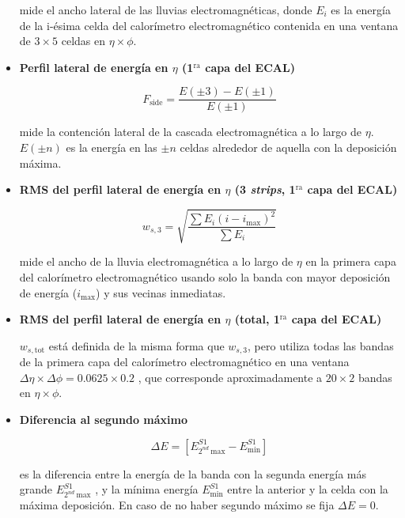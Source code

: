 \begin{itemize}
		mide el ancho lateral de las lluvias electromagnéticas, donde $E_{i}$ es la energía de la i-ésima celda del calorímetro electromagnético contenida en una ventana de $3\times 5$ celdas en $\eta \times \phi$.

	\item  \textbf{Perfil lateral de energía en $\eta$ (1$^{\text{ra}}$ capa del ECAL)}

		\begin{equation}
		F_{\text{side}}=\frac{E(\pm 3)-E(\pm 1)}{E(\pm 1)}
		\end{equation}

		mide la contención lateral de la cascada electromagnética a lo largo de $\eta$. $E(\pm n)$ es la energía en las $\pm n$ celdas alrededor de aquella con la deposición máxima.

	\item  \textbf{RMS del perfil lateral de energía en $\eta$ (3 \textit{strips}, 1$^{\text{ra}}$ capa del ECAL)}

		\begin{equation}
		w_{s,3}=\sqrt{\frac{\sum E_{i}(i-i_{\text{max}})^{2}}{\sum E_{i}}}
		\end{equation}

		mide el ancho de la lluvia electromagnética a lo largo de $\eta$ en la primera capa del calorímetro electromagnético usando solo la banda con mayor deposición de energía ($i_{\text{max}}$) y sus vecinas inmediatas.

	\item  \textbf{RMS del perfil lateral de energía en $\eta$ (total, 1$^{\text{ra}}$ capa del ECAL)}

		$w_{s,\text{tot}}$ está definida de la misma forma que $w_{s,3}$, pero utiliza todas las bandas de la primera capa del calorímetro electromagnético en una ventana $\Delta\eta\times\Delta\phi = 0.0625 \times 0.2$ , que corresponde aproximadamente a $20\times 2$ bandas en $\eta \times \phi$.

	\item  \textbf{Diferencia al segundo máximo}

		\begin{equation}
		\Delta E=[E_{2^{nd} \:\text{max}}^{S1} - E_{\text{min}}^{S1}]
		\end{equation}

		es la diferencia entre la energía de la banda con la segunda energía más grande $E_{2^{nd} \:\text{max}}^{S1}$ , y la mínima energía $E_{\text{min}}^{S1}$ entre la anterior y la celda con la máxima deposición. En caso de no haber segundo máximo se fija $\Delta E = 0$.


\end{itemize}
